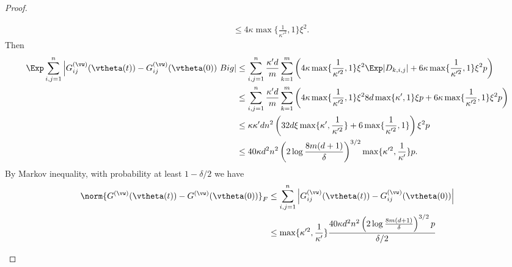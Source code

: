 \documentclass{article}
\begin{document}
\begin{proof}
\begin{enumerate}[(a)]
\begin{enumerate}[(i)]
\begin{equation}
\begin{aligned}
                                 & \leq 4\kappa\max\{\frac{1}{\kappa'^2},1\}\xi^2.
                            \end{aligned}
                        \end{equation}
                        Then
                        \begin{equation}
                            \begin{aligned}
                                \Exp\sum_{i,j=1}^n\Big|G_{ij}^{(\vw)}(\vtheta(t))-G_{ij}^{(\vw)}(\vtheta(0))\
                                Big|
                                 & \leq\sum_{i,j=1}^n\frac{\kappa' d}{m}\sum_{k=1}^m\left(4\kappa\max\{\frac{1}{\kappa'^2},1\}\xi^2\Exp|D_{k,i,j}|+6\kappa\max\{\frac{1}{\kappa'^2},1\}\xi^2 p\right)           \\
                                 & \leq\sum_{i,j=1}^n\frac{\kappa' d}{m}\sum_{k=1}^m\left(4\kappa\max\{\frac{1}{\kappa'^2},1\}\xi^2 8d\max\{\kappa',1\}\xi p+6\kappa\max\{\frac{1}{\kappa'^2},1\}\xi^2 p\right) \\
                                 & \leq \kappa\kappa' d n^2\left(32d\xi\max\{\kappa',\frac{1}{\kappa'^2} \}   +6\max\{\frac{1}{\kappa'^2},1\}\right)\xi^2 p                                                     \\
                                 & \leq 40\kappa d^2n^2\left(2\log\frac{8m(d+1)}{\delta}\right)^{3/2}\max\{\kappa'^2,\frac{1}{\kappa'}\} p.
                            \end{aligned}
                        \end{equation}
                        By Markov inequality, with probability at least $1-\delta/2$ we have
                        \begin{equation}
                            \begin{aligned}
                                \norm{G^{(\vw)}(\vtheta(t))-G^{(\vw)}(\vtheta(0))}_F
                                 & \leq \sum_{i,j=1}^n\Big|G_{ij}^{(\vw)}(\vtheta(t))-G^{(\vw)}_{ij}(\vtheta(0))\Big|                                                                                                                                                         \\
                                 & \leq \max\{\kappa'^2,\frac{1}{\kappa'}\}\frac{40\kappa d^2n^2\left(2\log\frac{8m(d+1)}{\delta}\right)^{3/2} p}{\delta/2}                                                                                                                   \\

\end{aligned}
\end{equation}
\end{enumerate}
\end{enumerate}
\end{proof}
\end{document}
